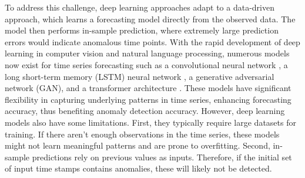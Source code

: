 \documentclass[11pt]{article}
\begin{document}
To address this challenge, deep learning approaches adapt to a data-driven approach, which learns a forecasting model directly from the observed data. The model then performs in-sample prediction, where extremely large prediction errors would indicate anomalous time points. With the rapid development of deep learning in computer vision and natural language processing, numerous models now exist for time series forecasting such as a convolutional neural network \citep{munir2018deepant}, a long short-term memory (LSTM) neural network \citep{malhotra2015long, malhotra2016lstm}, a generative adversarial network (GAN)\citep{geiger2020tadgan}, and a transformer architecture \citep{xu2021anomaly, nie2022time}. These models have significant flexibility in capturing underlying patterns in time series, enhancing forecasting accuracy, thus benefiting anomaly detection accuracy. However, deep learning models also have some limitations. First, they typically require large datasets for training. If there aren't enough observations in the time series, these models might not learn meaningful patterns and are prone to overfitting. Second, in-sample predictions rely on previous values as inputs. Therefore, if the initial set of input time stamps contains anomalies, these will likely not be detected.






\end{document}
